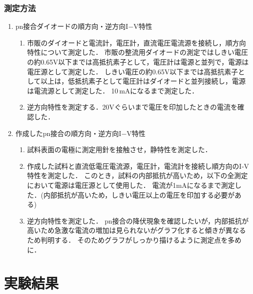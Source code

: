 \documentclass[11pt]{jarticle}
\begin{document}
		\subsubsection{測定方法}
			\begin{enumerate}
				\item pn接合ダイオードの順方向・逆方向I−V特性\\
					\begin{enumerate}
						\item 市販のダイオードと電流計，電圧計，直流電圧電流源を接続し，順方向特性について測定した．
							  市販の整流用ダイオードの測定ではしきい電圧の約0.65V以下までは高抵抗素子として，電圧計は電源と並列で，電源は電圧源として測定した．
							  しきい電圧の約0.65V以下までは高抵抗素子として以上は，低抵抗素子として電圧計はダイオードと並列接続し，電源は電流源として測定した．
							  10\,mAになるまで測定した．
						\item 逆方向特性を測定する．20Vぐらいまで電圧を印加したときの電流を確認した．
					\end{enumerate}
				\item 作成したpn接合の順方向・逆方向I−V特性\\
					\begin{enumerate}
						\item 試料表面の電極に測定用針を接触させ，静特性を測定した．
						\item 作成した試料と直流低電圧電流源，電圧計，電流計を接続し順方向のI‐V特性を測定した．
							  このとき，試料の内部抵抗が高いため，以下の全測定において電源は電圧源として使用した．
							  電流が1mAになるまで測定した．(内部抵抗が高いため，しきい電圧以上の電圧を印加する必要がある)
						\item 逆方向特性を測定した．
							  pn接合の降伏現象を確認したいが，内部抵抗が高いため急激な電流の増加は見られないがグラフ化すると傾きが異なるため判明する．
							  そのためグラフがしっかり描けるように測定点を多めに．
					\end{enumerate}
			\end{enumerate}

\section{実験結果}
\end{document}
